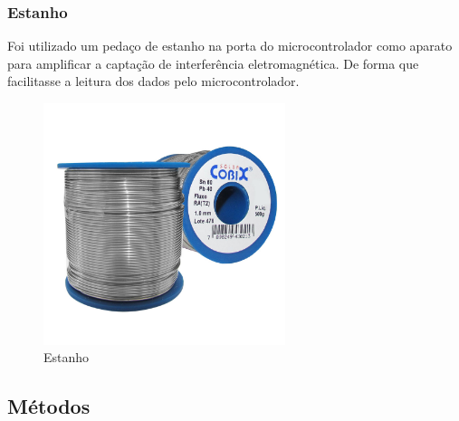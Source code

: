 \subsubsection{Estanho}

Foi utilizado um pedaço de estanho na porta do microcontrolador como aparato para amplificar a captação de interferência eletromagnética. De forma que facilitasse a leitura dos dados pelo microcontrolador.
 \begin{figure}[H]
 	\label{fig2}
 	\begin{centering}
 		\includegraphics[width = 200pt]{img/estanho.jpg}
 		\caption{Estanho}
 	\end{centering}	
 		
 \end{figure}

\subsection{Métodos}